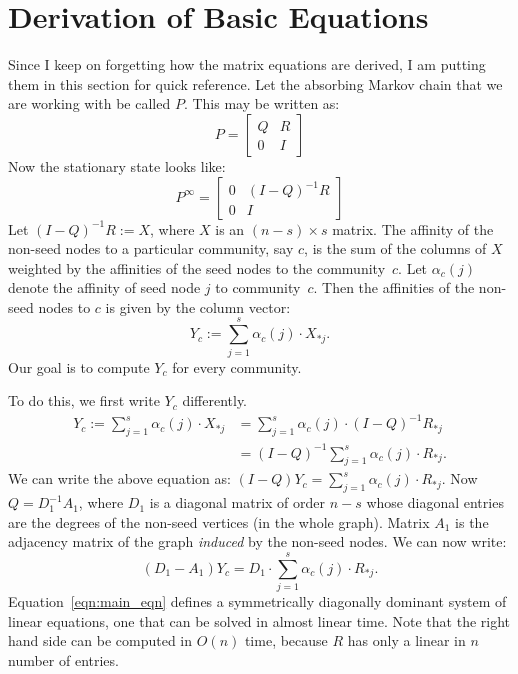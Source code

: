 \documentclass[12pt]{article}
\begin{document}
\section{Derivation of Basic Equations}

Since I keep on forgetting how the matrix equations are derived, I am putting 
them in this section for quick reference. Let the absorbing Markov chain 
that we are working with be called $P$. This may be written as:
\[P  = 
\begin{bmatrix}
Q & R \\
0 & I
\end{bmatrix}
\]
Now the stationary state looks like:
\[P^{\infty}  = 
\begin{bmatrix}
0 & (I - Q)^{-1} R \\
0 & I
\end{bmatrix}
\]
Let $(I - Q)^{-1} R := X$, where $X$ is an $(n - s) \times s$ matrix. The affinity 
of the non-seed nodes to a particular community, say $c$, is the sum of the columns 
of $X$ weighted by the affinities of the seed nodes to the community~$c$. Let $\alpha_c(j)$ 
denote the affinity of seed node $j$ to community~$c$. Then the affinities of the non-seed
nodes to $c$ is given by the column vector:
\[
	Y_c := \sum_{j = 1}^{s} \alpha_c(j) \cdot X_{*j}.
\]
Our goal is to compute $Y_c$ for every community. 

To do this, we first write $Y_c$ differently.
\begin{align*}
	Y_c := \sum_{j = 1}^{s} \alpha_c(j) \cdot X_{*j} 
		& = \sum_{j = 1}^{s}\alpha_c(j) \cdot (I - Q)^{-1} R_{*j} \\	
		& = (I - Q)^{-1} \sum_{j = 1}^{s} \alpha_c(j) \cdot R_{*j}.
\end{align*}
We can write the above equation as: $(I - Q)Y_c = \sum_{j = 1}^{s} \alpha_c(j) \cdot R_{*j}$.
Now $Q = D_1^{-1}A_1$, where $D_1$ is a diagonal matrix of order $n - s$ whose diagonal entries 
are the degrees of the non-seed vertices (in the whole graph). Matrix $A_1$ is the adjacency
matrix of the graph \emph{induced} by the non-seed nodes. We can now write:
\begin{equation}\label{eqn:main_eqn}
	(D_1 - A_1) Y_c = D_1 \cdot \sum_{j = 1}^{s} \alpha_c(j) \cdot R_{*j}.
\end{equation}
Equation~\ref{eqn:main_eqn} defines a symmetrically diagonally dominant system 
of linear equations, one that can be solved in almost linear time. Note that 
the right hand side can be computed in $O(n)$ time, because $R$ has only a linear 
in $n$ number of entries. 
\end{document}

